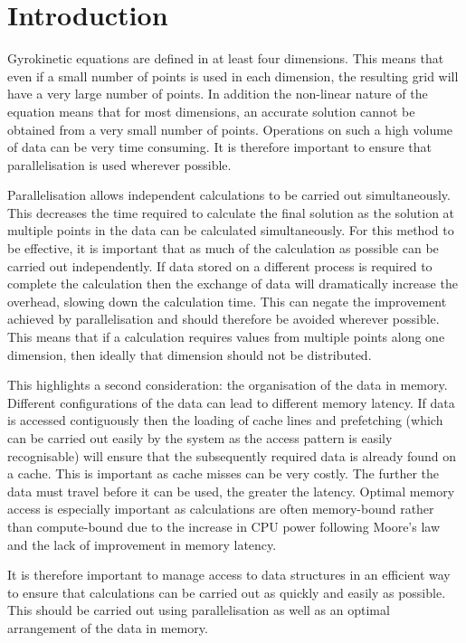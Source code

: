 
\section{Introduction}

Gyrokinetic equations are defined in at least four dimensions. This means that even if a small number of points is used in each dimension, the resulting grid will have a very large number of points. In addition the non-linear nature of the equation means that for most dimensions, an accurate solution cannot be obtained from a very small number of points. Operations on such a high volume of data can be very time consuming. It is therefore important to ensure that parallelisation is used wherever possible.

Parallelisation allows independent calculations to be carried out simultaneously. This decreases the time required to calculate the final solution as the solution at multiple points in the data can be calculated simultaneously. For this method to be effective, it is important that as much of the calculation as possible can be carried out independently. If data stored on a different process is required to complete the calculation then the exchange of data will dramatically increase the overhead, slowing down the calculation time. This can negate the improvement achieved by parallelisation and should therefore be avoided wherever possible. This means that if a calculation requires values from multiple points along one dimension, then ideally that dimension should not be distributed.

This highlights a second consideration: the organisation of the data in memory. Different configurations of the data can lead to different memory latency. If data is accessed contiguously then the loading of cache lines and prefetching (which can be carried out easily by the system as the access pattern is easily recognisable) will ensure that the subsequently required data is already found on a cache. This is important as cache misses can be very costly. The further the data must travel before it can be used, the greater the latency. Optimal memory access is especially important as calculations are often memory-bound rather than compute-bound due to the increase in CPU power following Moore's law and the lack of improvement in memory latency.

It is therefore important to manage access to data structures in an efficient way to ensure that calculations can be carried out as quickly and easily as possible. This should be carried out using parallelisation as well as an optimal arrangement of the data in memory.

